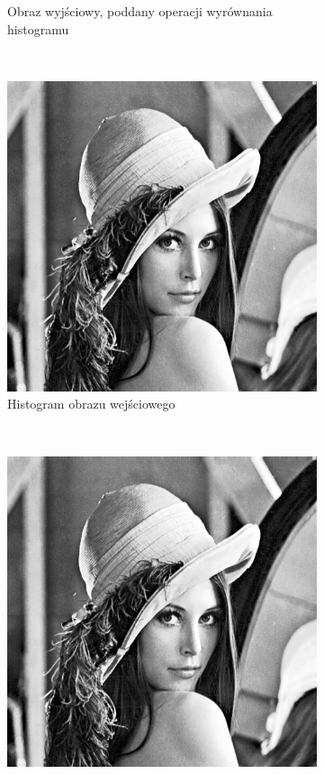 \begin{figure}
\begin{subfigure}[b]{0.45\textwidth}
    \caption{Obraz wyjściowy, poddany operacji wyrównania histogramu}
    \label{fig:equalize_histogram_after}
  \end{subfigure}
  ~
  \begin{subfigure}[b]{0.45\textwidth}
    \includegraphics[width=\textwidth]{img/equalize-histogram-after}
    \caption{Histogram obrazu wejściowego}
  \end{subfigure}
  ~
  \begin{subfigure}[b]{0.45\textwidth}
    \includegraphics[width=\textwidth]{img/equalize-histogram-after}

\end{subfigure}
\end{figure}
